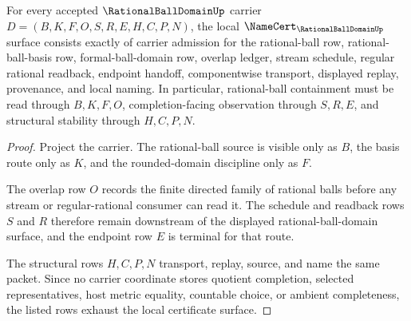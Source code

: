 \begin{theorem}\label{thm:rational-ball-domain-namecert-obligations}
For every accepted $\RationalBallDomainUp$ carrier $D=(B,K,F,O,S,R,E,H,C,P,N)$, the local $\NameCert_{\RationalBallDomainUp}$ surface consists exactly of carrier admission for the rational-ball row, rational-ball-basis row, formal-ball-domain row, overlap ledger, stream schedule, regular rational readback, endpoint handoff, componentwise transport, displayed replay, provenance, and local naming. In particular, rational-ball containment must be read through $B,K,F,O$, completion-facing observation through $S,R,E$, and structural stability through $H,C,P,N$.
\end{theorem}
\begin{proof}
Project the carrier. The rational-ball source is visible only as $B$, the basis route only as $K$, and the rounded-domain discipline only as $F$.

The overlap row $O$ records the finite directed family of rational balls before any stream or regular-rational consumer can read it. The schedule and readback rows $S$ and $R$ therefore remain downstream of the displayed rational-ball-domain surface, and the endpoint row $E$ is terminal for that route.

The structural rows $H,C,P,N$ transport, replay, source, and name the same packet. Since no carrier coordinate stores quotient completion, selected representatives, host metric equality, countable choice, or ambient completeness, the listed rows exhaust the local certificate surface.
\end{proof}

